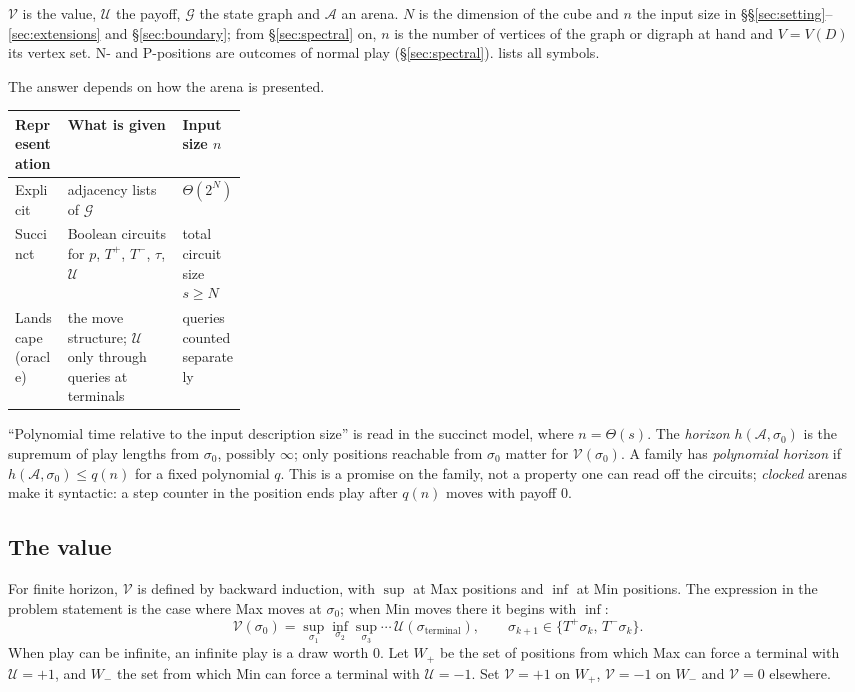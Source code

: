 \documentclass[final]{siamart0516}
\numberwithin{theorem}{section}
\numberwithin{equation}{section}
\theoremstyle{siamnonum}
\renewenvironment{remark*}{\remarkstar}{\endremarkstar}
\theoremstyle{plain}
\newcommand{\val}{\mathcal{V}}            %
\newcommand{\pay}{\mathcal{U}}            %
\newcommand{\SG}{\mathcal{G}}             %
\newcommand{\arena}{\mathcal{A}}          %
\begin{document}
\begin{remark*}[conventions]
$\val$ is the value, $\pay$ the payoff, $\SG$ the state graph and $\arena$ an arena. $N$ is the dimension of the cube and $n$ the input size in \S\S\ref{sec:setting}--\ref{sec:extensions} and \S\ref{sec:boundary}; from \S\ref{sec:spectral} on, $n$ is the number of vertices of the graph or digraph at hand and $V=V(D)$ its vertex set. N- and P-positions are outcomes of normal play (\S\ref{sec:spectral}).  lists all symbols.
\end{remark*}

The answer depends on how the arena is presented.

\begin{center}\small
\begin{tabularx}{\linewidth}{@{}l>{\raggedright\arraybackslash}X>{\raggedright\arraybackslash}p{0.27\linewidth}@{}}
\toprule
Representation & What is given & Input size $n$\\ \midrule
Explicit & adjacency lists of $\SG$ & $\Theta(2^N)$\\
Succinct & Boolean circuits for $p$, $T^{+}$, $T^{-}$, $\tau$, $\pay$ & total circuit size $s\ge N$\\
Landscape (oracle) & the move structure; $\pay$ only through queries at terminals & queries counted separately\\
\bottomrule
\end{tabularx}
\end{center}

``Polynomial time relative to the input description size'' is read in the succinct model, where $n=\Theta(s)$. The \emph{horizon} $h(\arena,\sigma_0)$ is the supremum of play lengths from $\sigma_0$, possibly $\infty$; only positions reachable from $\sigma_0$ matter for $\val(\sigma_0)$. A family has \emph{polynomial horizon} if $h(\arena,\sigma_0)\le q(n)$ for a fixed polynomial $q$. This is a promise on the family, not a property one can read off the circuits; \emph{clocked} arenas make it syntactic: a step counter in the position ends play after $q(n)$ moves with payoff $0$.

\subsection{The value}
For finite horizon, $\val$ is defined by backward induction, with $\sup$ at Max positions and $\inf$ at Min positions. The expression in the problem statement is the case where Max moves at $\sigma_0$; when Min moves there it begins with $\inf$:
\[
\val(\sigma_0)=\sup_{\sigma_1}\inf_{\sigma_2}\sup_{\sigma_3}\cdots\,\pay(\sigma_{\mathrm{terminal}}),\qquad \sigma_{k+1}\in\{T^{+}\sigma_k,\,T^{-}\sigma_k\}.
\]
When play can be infinite, an infinite play is a draw worth $0$. Let $W_{+}$ be the set of positions from which Max can force a terminal with $\pay=+1$, and $W_{-}$ the set from which Min can force a terminal with $\pay=-1$. Set $\val=+1$ on $W_{+}$, $\val=-1$ on $W_{-}$ and $\val=0$ elsewhere.
\end{document}
